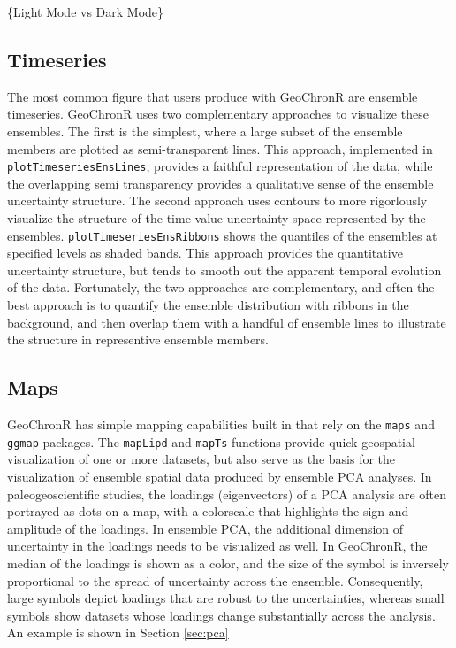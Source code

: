 \documentclass[gc, manuscript]{copernicus}
\begin{document}
\{Light Mode vs Dark Mode\}

\subsection{Timeseries}

The most common figure that users produce with GeoChronR are ensemble timeseries.
GeoChronR uses two complementary approaches to visualize these ensembles.
The first is the simplest, where a large subset of the ensemble members are plotted as semi-transparent lines.
This approach, implemented in \texttt{plotTimeseriesEnsLines}, provides a faithful representation of the data, while the overlapping semi transparency provides a qualitative sense of the ensemble uncertainty structure.
The second approach uses contours to more rigorlously visualize the structure of the time-value uncertainty space represented by the ensembles.
\texttt{plotTimeseriesEnsRibbons} shows the quantiles of the ensembles at specified levels as shaded bands.
This approach provides the quantitative uncertainty structure, but tends to smooth out the apparent temporal evolution of the data.
Fortunately, the two approaches are complementary, and often the best approach is to quantify the ensemble distribution with ribbons in the background, and then overlap them with a handful of ensemble lines to illustrate the structure in representive ensemble members.

\subsection{Maps}

GeoChronR has simple mapping capabilities built in that rely on the \texttt{maps} \citep{maps} and \texttt{ggmap} \citep{ggmap} packages.
The \texttt{mapLipd} and \texttt{mapTs} functions provide quick geospatial visualization of one or more datasets, but also serve as the basis for the visualization of ensemble spatial data produced by ensemble PCA analyses.
In paleogeoscientific studies, the loadings (eigenvectors) of a PCA analysis are often portrayed as dots on a map, with a colorscale that highlights the sign and amplitude of the loadings.
In ensemble PCA, the additional dimension of uncertainty in the loadings needs to be visualized as well.
In GeoChronR, the median of the loadings is shown as a color, and the size of the symbol is inversely proportional to the spread of uncertainty across the ensemble.
Consequently, large symbols depict loadings that are robust to the uncertainties, whereas small symbols show datasets whose loadings change substantially across the analysis.
An example is shown in Section \ref{sec:pca}
\end{document}
